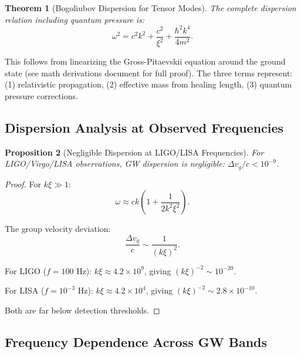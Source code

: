 \documentclass[11pt,a4paper]{article}
\newtheorem{theorem}{Theorem}[section]
\newtheorem{proposition}[theorem]{Proposition}
\theoremstyle{definition}
\theoremstyle{remark}
\begin{document}
\begin{theorem}[Bogoliubov Dispersion for Tensor Modes]
\label{thm:bogoliubov}
The complete dispersion relation including quantum pressure is:
\begin{equation}
\label{eq:bogoliubov}
\boxed{\omega^2 = c^2 k^2 + \frac{c^2}{\xi^2} + \frac{\hbar^2 k^4}{4m^2}.}
\end{equation}
\end{theorem}

This follows from linearizing the Gross-Pitaevskii equation around the ground state (see math derivations document for full proof). The three terms represent: (1) relativistic propagation, (2) effective mass from healing length, (3) quantum pressure corrections.

\subsection{Dispersion Analysis at Observed Frequencies}
\label{sec:dispersion_analysis}

\begin{proposition}[Negligible Dispersion at LIGO/LISA Frequencies]
\label{prop:negligible_dispersion}
For LIGO/Virgo/LISA observations, GW dispersion is negligible: $\Delta v_g/c < 10^{-9}$.
\end{proposition}

\begin{proof}
For $k\xi \gg 1$:
\begin{equation}
\omega \approx ck\left(1 + \frac{1}{2k^2\xi^2}\right).
\end{equation}

The group velocity deviation:
\begin{equation}
\frac{\Delta v_g}{c} \sim \frac{1}{(k\xi)^2}.
\end{equation}

For LIGO ($f = 100$ Hz): $k\xi \approx 4.2 \times 10^{9}$, giving $(k\xi)^{-2} \sim 10^{-20}$.

For LISA ($f = 10^{-3}$ Hz): $k\xi \approx 4.2 \times 10^{4}$, giving $(k\xi)^{-2} \sim 2.8 \times 10^{-10}$.

Both are far below detection thresholds.
\end{proof}

\subsection{Frequency Dependence Across GW Bands}
\label{sec:frequency_bands}
\end{document}
